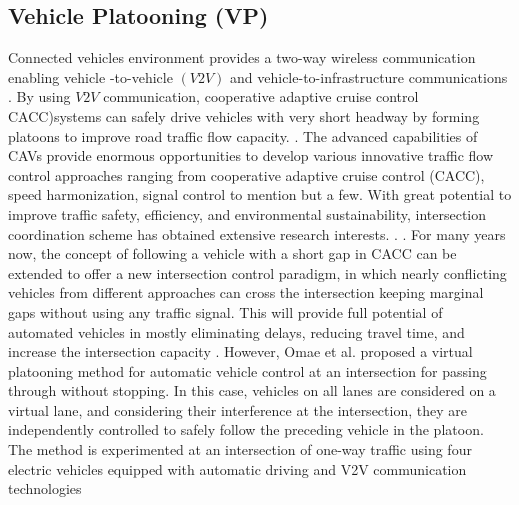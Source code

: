 \documentclass{book}
\begin{document}
	\subsection{Vehicle Platooning (VP)}
Connected vehicles environment provides a two-way wireless communication enabling vehicle -to-vehicle $(V2V)$ and vehicle-to-infrastructure communications \cite{kamal2013coordination}.
By using $V2V $ communication, cooperative adaptive cruise control CACC)systems can safely drive vehicles with very short headway by forming platoons to improve road traffic flow capacity. \cite{van2006impact,ploeg2011connect,omae2010automatic}. The  advanced capabilities of  CAVs provide enormous  opportunities  to  develop  various  innovative  traffic flow  control  approaches ranging from  cooperative adaptive cruise control (CACC), speed harmonization,  signal  control to mention but a few. With great potential to improve traffic safety, efficiency, and environmental sustainability, intersection coordination scheme has obtained extensive research interests. \cite{gong2018cooperative,chan2012cooperative,zhou2017rolling,swaroop1994comparision}.
\cite{khondaker2015variable,feng2015real,knorn2014passivity,wang2014rolling}. For many years now, the concept of following a vehicle with a short gap in CACC can be extended to offer a new intersection control paradigm, in which
nearly conflicting vehicles from different approaches can cross the intersection keeping marginal gaps without using any traffic signal. This will provide full potential of automated vehicles in mostly eliminating delays, reducing travel time, and increase the intersection capacity . However, Omae et al.\cite{omae2010automatic} proposed a virtual platooning method for automatic vehicle control at an intersection for passing through without stopping. In this case, vehicles on all lanes are considered on a virtual lane, and considering their interference
at the intersection, they are independently controlled to safely follow the preceding vehicle in the platoon. The method is experimented at an intersection of one-way traffic using four electric vehicles equipped with automatic driving and V2V communication technologies
\end{document}
